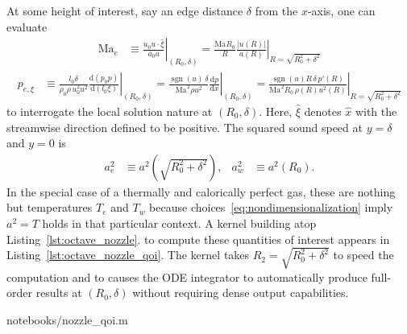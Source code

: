 \documentclass[letterpaper,11pt,nointlimits,reqno]{amsart}
\newcommand{\Mach}[1][]{\ensuremath{\mbox{Ma}_{#1}}}
\begin{document}
At some height of interest, say an edge distance $\delta$ from the $x$-axis,
one can evaluate
\begin{align}
  \Mach[e]{}
  &\equiv
  \left. \frac{u_0 u\cdot\hat{\xi}}{a_0 a} \right|_{\left(R_0,\delta\right)}
  =
  \left.
    \frac{\Mach R_0}{R}
    \frac{\left|u\!\left(R\right)\right|}
         {      a\!\left(R\right)       }
  \right|_{R = \sqrt{R_0^2 + \delta^2}}
\end{align}
\begin{align}
  p_{e,\xi}
  &\equiv
  \left.
  \frac{l_0 \delta}{\rho_0 \rho \, u_0^2 u^2}
    \frac{\mathrm{d}\left(p_0 p\right)}{\mathrm{d}\left(l_0 \xi\right)}
  \right|_{\left(R_0,\delta\right)}
  =
  \left.
    \frac{\operatorname{sgn}(u) \, \delta}{\Mach^2 \rho u^2}
      \frac{\mathrm{d}p}{\mathrm{d}x}
  \right|_{\left(R_0,\delta\right)}
  =
  \left.
    \frac{\operatorname{sgn}(u) R \, \delta \, p'\!\left(R\right)}
         {\Mach^2 R_0 \, \rho\!\left(R\right) u^2\!\left(R\right)}
  \right|_{R=\sqrt{R_0^2 + \delta^2}}
\end{align}
to interrogate the local solution nature at $\left(R_0, \delta\right)$.  Here,
$\hat{\xi}$ denotes $\hat{x}$ with the streamwise direction defined to be
positive.  The squared sound speed at $y=\delta$ and $y=0$ is
\begin{align}
  a^2_e
  &\equiv
  a^2\!\left(\sqrt{R_0^2 + \delta^2}\right)
,
&
  a^2_w
  &\equiv
  a^2\!\left(R_0\right)
.
\end{align}
In the special case of a thermally and calorically perfect gas, these are
nothing but temperatures $T_e$ and $T_w$ because
choices~\eqref{eq:nondimensionalization} imply $a^2 = T$ holds in that
particular context.  A kernel building atop Listing~\ref{lst:octave_nozzle}.
to compute these quantities of interest appears in
Listing~\ref{lst:octave_nozzle_qoi}.  The kernel takes $R_2 = \sqrt{R_0^2 +
\delta^2}$ to speed the computation and to causes the ODE integrator to
automatically produce full-order results at $\left(R_0,\delta\right)$ without
requiring dense output capabilities.


                {notebooks/nozzle_qoi.m}
\end{document}
